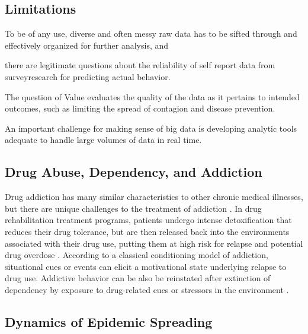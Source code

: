 \documentclass[sigconf]{acmart}
\begin{document}
\subsection{Limitations}

To be of any use, diverse and often messy raw data has to be sifted through and 
effectively organized for further analysis, and 

there are legitimate questions about the reliability of self report data from 
surveyresearch for predicting actual behavior. 

The question of Value evaluates the quality of the data as it pertains to 
intended outcomes, such as limiting the spread of contagion and disease 
prevention. 

An important challenge for making sense of big data is developing analytic 
tools adequate to handle large volumes of data in real time.

\subsection{Drug Abuse, Dependency, and Addiction}

Drug addiction has many similar characteristics to other chronic medical 
illnesses, but there are unique challenges to the treatment of addiction
\cite{marsch12, swendson16}. In drug rehabilitation treatment programs, 
patients undergo intense detoxification that reduces their drug tolerance, but 
are then released back into the environments associated with their drug use, 
putting them at high risk for relapse and potential drug overdose 
\cite{johnson11}. According to a classical conditioning model of addiction, 
situational cues or events can elicit a motivational state underlying relapse 
to drug use. Addictive behavior can be also be reinstated after extinction of 
dependency by exposure to drug-related cues or stressors in the environment 
\cite{shaham03}. 


\subsection{Dynamics of Epidemic Spreading}
\end{document}
